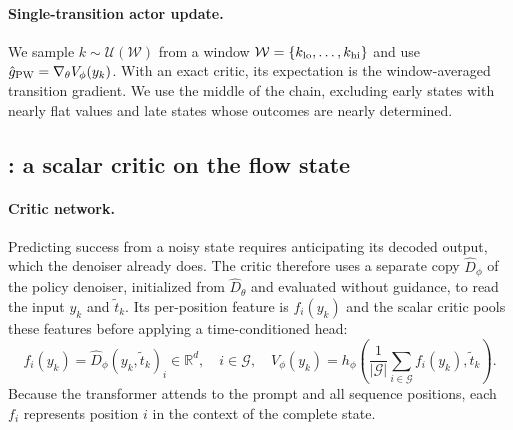 
\paragraph{Single-transition actor update.}
We sample $k\sim\mathcal U(\mathcal W)$ from a window
$\mathcal W=\{k_{\rm lo},\dots,k_{\rm hi}\}$ and use $\hat g_{\rm PW}=\nabla_\theta V_\phi(y_k)$. With an exact critic, its expectation is the window-averaged transition gradient. We use the middle of the chain, excluding early states with nearly flat values and late states whose outcomes are nearly determined. 

\subsection{\methodSVGScalar{}: a scalar critic on the flow state}
\label{sec:jpc_scalar}

\paragraph{Critic network.}
Predicting success from a noisy state requires anticipating its decoded output, which the denoiser already does. The critic therefore uses a separate copy $\hat D_\phi$ of the policy denoiser, initialized from $\hat D_\theta$ and evaluated without guidance, to read the input $y_k$ and $\tilde t_k$. Its per-position feature is $f_i(y_k)$ and the scalar critic pools these features before applying a time-conditioned head:
\begin{equation}
f_i(y_k)
=
\hat D_\phi(y_k,\tilde t_k)_i
\in\mathbb R^d,
\quad i\in\mathcal G, 
\quad V_\phi(y_k)
=
h_\phi\!\left(
\frac{1}{|\mathcal G|}
\sum_{i\in\mathcal G}f_i(y_k),
\tilde t_k
\right).
\label{eq:critic1d}
\end{equation}
Because the transformer attends to the prompt and all sequence positions, each $f_i$ represents position $i$ in the context of the complete state. 

